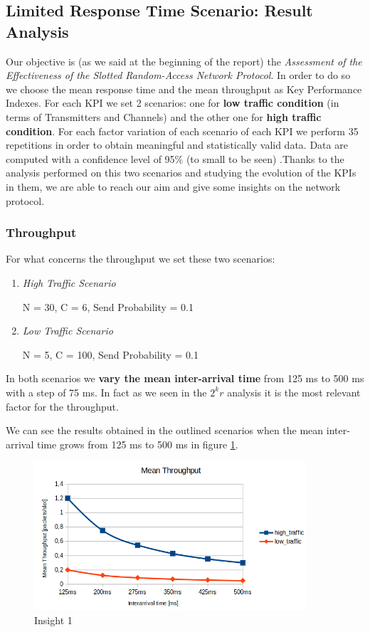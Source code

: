 \subsection{Limited Response Time Scenario: Result Analysis}
Our objective is (as we said at the beginning of the report) the \textit{Assessment of the Effectiveness of the Slotted Random-Access Network Protocol}. In order to do so we choose the mean response time and the mean throughput as Key Performance Indexes. For each KPI we set 2 scenarios: one for \textbf{low traffic condition} (in terms of Transmitters and Channels) and the other one for \textbf{high traffic condition}. For each factor variation of each scenario of each KPI we perform 35 repetitions in order to obtain meaningful and statistically valid data. Data are computed with a confidence level of 95\% (to small to be seen) .Thanks to the analysis performed on this two scenarios and studying the evolution of the KPIs in them, we are able to reach our aim and give some insights on the network protocol. 

\subsubsection{Throughput}
For what concerns the throughput we set these two scenarios:
\begin{enumerate}
	\item \textit{High Traffic Scenario}
	
	N = 30, C = 6, Send Probability = 0.1
	\item \textit{Low Traffic Scenario}
	
	N = 5, C = 100, Send Probability = 0.1
\end{enumerate}

\noindent In both scenarios we \textbf{vary the mean inter-arrival time} from 125 ms to 500 ms with a step of 75 ms. In fact as we seen in the $2^kr$ analysis it is the most relevant factor for the throughput. 

\noindent We can see the results obtained in the outlined scenarios when the mean inter-arrival time grows from 125 ms to 500 ms in figure \ref{img: insight1_throughput}.

\begin{figure}[H]
	\centering
	\includegraphics[width=0.9\textwidth]{img/insight1_throughput.png}
	\caption{Insight 1}
	\label{img: insight1_throughput}
\end{figure}

